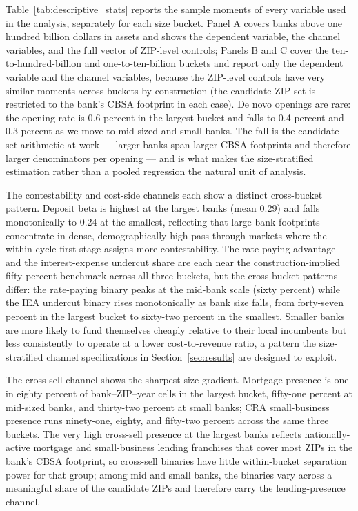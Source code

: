 Table~\ref{tab:descriptive_stats} reports the sample moments of every variable used in the analysis, separately for each size bucket. Panel A covers banks above one hundred billion dollars in assets and shows the dependent variable, the channel variables, and the full vector of ZIP-level controls; Panels B and C cover the ten-to-hundred-billion and one-to-ten-billion buckets and report only the dependent variable and the channel variables, because the ZIP-level controls have very similar moments across buckets by construction (the candidate-ZIP set is restricted to the bank's CBSA footprint in each case). De novo openings are rare: the opening rate is 0.6 percent in the largest bucket and falls to 0.4 percent and 0.3 percent as we move to mid-sized and small banks. The fall is the candidate-set arithmetic at work --- larger banks span larger CBSA footprints and therefore larger denominators per opening --- and is what makes the size-stratified estimation rather than a pooled regression the natural unit of analysis.

The contestability and cost-side channels each show a distinct cross-bucket pattern. Deposit beta is highest at the largest banks (mean 0.29) and falls monotonically to 0.24 at the smallest, reflecting that large-bank footprints concentrate in dense, demographically high-pass-through markets where the within-cycle first stage assigns more contestability. The rate-paying advantage and the interest-expense undercut share are each near the construction-implied fifty-percent benchmark across all three buckets, but the cross-bucket patterns differ: the rate-paying binary peaks at the mid-bank scale (sixty percent) while the IEA undercut binary rises monotonically as bank size falls, from forty-seven percent in the largest bucket to sixty-two percent in the smallest. Smaller banks are more likely to fund themselves cheaply relative to their local incumbents but less consistently to operate at a lower cost-to-revenue ratio, a pattern the size-stratified channel specifications in Section~\ref{sec:results} are designed to exploit.

The cross-sell channel shows the sharpest size gradient. Mortgage presence is one in eighty percent of bank--ZIP--year cells in the largest bucket, fifty-one percent at mid-sized banks, and thirty-two percent at small banks; CRA small-business presence runs ninety-one, eighty, and fifty-two percent across the same three buckets. The very high cross-sell presence at the largest banks reflects nationally-active mortgage and small-business lending franchises that cover most ZIPs in the bank's CBSA footprint, so cross-sell binaries have little within-bucket separation power for that group; among mid and small banks, the binaries vary across a meaningful share of the candidate ZIPs and therefore carry the lending-presence channel.

